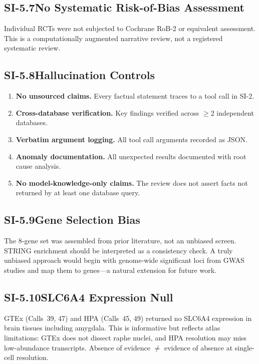 \subsection*{SI-5.7\quad No Systematic Risk-of-Bias Assessment}

Individual RCTs were not subjected to Cochrane RoB-2 or equivalent
assessment.  This is a computationally augmented narrative review, not a
registered systematic review.

\subsection*{SI-5.8\quad Hallucination Controls}

\begin{enumerate}[nosep]
  \item \textbf{No unsourced claims.}  Every factual statement traces to a
        tool call in SI-2.
  \item \textbf{Cross-database verification.}  Key findings verified across
        $\geq$2 independent databases.
  \item \textbf{Verbatim argument logging.}  All tool call arguments recorded
        as JSON.
  \item \textbf{Anomaly documentation.}  All unexpected results documented
        with root cause analysis.
  \item \textbf{No model-knowledge-only claims.}  The review does not assert
        facts not returned by at least one database query.
\end{enumerate}

\subsection*{SI-5.9\quad Gene Selection Bias}

The 8-gene set was assembled from prior literature, not an unbiased screen.
STRING enrichment should be interpreted as a consistency check.  A truly
unbiased approach would begin with genome-wide significant loci from GWAS
studies and map them to genes---a natural extension for future work.

\subsection*{SI-5.10\quad SLC6A4 Expression Null}

GTEx (Calls~39, 47) and HPA (Calls~45, 49) returned no SLC6A4 expression
in brain tissues including amygdala.  This is informative but reflects atlas
limitations: GTEx does not dissect raphe nuclei, and HPA resolution may
miss low-abundance transcripts.  Absence of evidence $\neq$ evidence of
absence at single-cell resolution.

